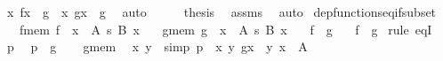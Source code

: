 \begin{isabellebody}
\ {\isachardoublequoteopen}{\isasymlangle}x{\isacharcomma}{\kern0pt}\ f{\isacharbackquote}{\kern0pt}x{\isasymrangle}\ {\isasymin}\ g{\isachardoublequoteclose}\ \ {\isachardoublequoteopen}{\isasymlangle}x{\isacharcomma}{\kern0pt}\ g{\isacharbackquote}{\kern0pt}x{\isasymrangle}\ {\isasymin}\ g{\isachardoublequoteclose}\ \isamarkupfalse%
\ auto\isanewline
\ \ \isamarkupfalse%
\ \isamarkupfalse%
\ {\isacharquery}{\kern0pt}thesis\ \isamarkupfalse%
\ assms\ \isamarkupfalse%
\ auto\isanewline
{}\isamarkupfalse%
%
\endisatagproof
{\isafoldproof}%
%
\isadelimproof
\isanewline
%
\endisadelimproof
\isanewline
{}\isamarkupfalse%
\ dep{\isacharunderscore}{\kern0pt}functions{\isacharunderscore}{\kern0pt}eq{\isacharunderscore}{\kern0pt}if{\isacharunderscore}{\kern0pt}subset{\isacharcolon}{\kern0pt}\isanewline
\ \ \ f{\isacharunderscore}{\kern0pt}mem{\isacharcolon}{\kern0pt}\ {\isachardoublequoteopen}f\ {\isasymin}\ {\isacharparenleft}{\kern0pt}x\ {\isasymin}\ A{\isacharparenright}{\kern0pt}\ {\isasymrightarrow}s\ {\isacharparenleft}{\kern0pt}B\ x{\isacharparenright}{\kern0pt}{\isachardoublequoteclose}\isanewline
\ \ \ g{\isacharunderscore}{\kern0pt}mem{\isacharcolon}{\kern0pt}\ {\isachardoublequoteopen}g\ {\isasymin}\ {\isacharparenleft}{\kern0pt}x\ {\isasymin}\ A{\isacharparenright}{\kern0pt}\ {\isasymrightarrow}s\ {\isacharparenleft}{\kern0pt}B{\isacharprime}{\kern0pt}\ x{\isacharparenright}{\kern0pt}{\isachardoublequoteclose}\isanewline
\ \ \ {\isachardoublequoteopen}f\ {\isasymsubseteq}\ g{\isachardoublequoteclose}\isanewline
\ \ \ {\isachardoublequoteopen}f\ {\isacharequal}{\kern0pt}\ g{\isachardoublequoteclose}\isanewline
%
\isadelimproof
%
\endisadelimproof
%
\isatagproof
{}\isamarkupfalse%
\ {\isacharparenleft}{\kern0pt}rule\ eqI{\isacharparenright}{\kern0pt}\isanewline
\ \ \isamarkupfalse%
\ p\ \isamarkupfalse%
\ {\isachardoublequoteopen}p\ {\isasymin}\ g{\isachardoublequoteclose}\isanewline
\ \ \isamarkupfalse%
\ g{\isacharunderscore}{\kern0pt}mem\ \isamarkupfalse%
\ x\ y\ \ {\isacharbrackleft}{\kern0pt}simp{\isacharbrackright}{\kern0pt}{\isacharcolon}{\kern0pt}\ {\isachardoublequoteopen}p\ {\isacharequal}{\kern0pt}\ {\isasymlangle}x{\isacharcomma}{\kern0pt}\ y{\isasymrangle}{\isachardoublequoteclose}\ {\isachardoublequoteopen}g{\isacharbackquote}{\kern0pt}x\ {\isacharequal}{\kern0pt}\ y{\isachardoublequoteclose}\ {\isachardoublequoteopen}x\ {\isasymin}\ A{\isachardoublequoteclose}\ \isamarkupfalse%

\end{isabellebody}

